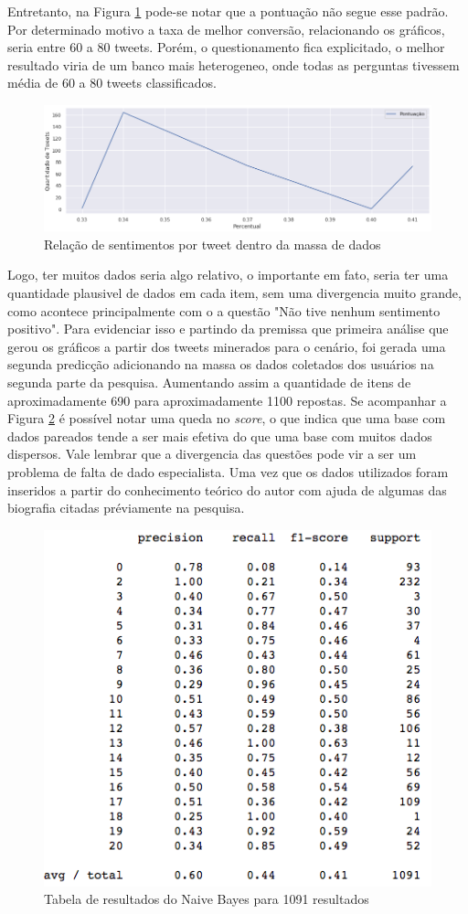 Entretanto, na Figura \ref{fig:qpp} pode-se notar que a pontuação não segue esse padrão. Por determinado motivo a taxa de melhor conversão, relacionando os gráficos, seria entre 60 a 80 tweets. Porém, o questionamento fica explicitado, o melhor resultado viria de um banco mais heterogeneo, onde todas as perguntas tivessem média de 60 a 80 tweets classificados.

\begin{figure}[!ht]
    \centering
    \includegraphics[width=.8\textwidth]{imagens/qpp.png}
    \caption{Relação de sentimentos por tweet dentro da massa de dados}
    \label{fig:qpp}
\end{figure}

Logo, ter muitos dados seria algo relativo, o importante em fato, seria ter uma quantidade plausivel de dados em cada item, sem uma divergencia muito grande, como acontece principalmente com o a questão "Não tive nenhum sentimento positivo". Para evidenciar isso e partindo da premissa que primeira análise que gerou os gráficos a partir dos tweets minerados para o cenário, foi gerada uma segunda predicção adicionando na massa os dados coletados dos usuários na segunda parte da pesquisa. Aumentando assim a quantidade de itens de aproximadamente 690 para aproximadamente 1100 repostas. Se acompanhar a Figura \ref{fig:prediction2} é possível notar uma queda no \textit{score}, o que indica que uma base com dados pareados tende a ser mais efetiva do que uma base com muitos dados dispersos. Vale lembrar que a divergencia das questões pode vir a ser um problema de falta de dado especialista. Uma vez que os dados utilizados foram inseridos a partir do conhecimento teórico do autor com ajuda de algumas das biografia citadas préviamente na pesquisa.

\begin{figure}[!ht]
    \centering
    \includegraphics[width=.5\textwidth]{imagens/prediction2.png}
    \caption{Tabela de resultados do Naive Bayes para 1091 resultados}
    \label{fig:prediction2}
\end{figure}

